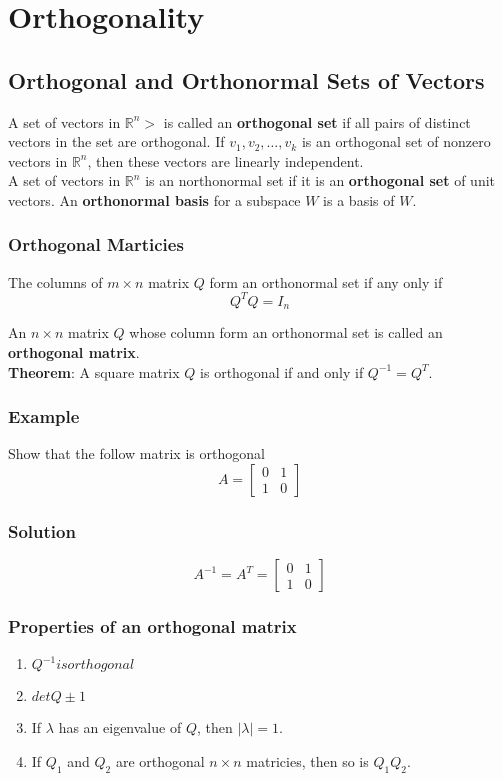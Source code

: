\setcounter{chapter}{4}
\chapter{Orthogonality}

\section{Orthogonal and Orthonormal Sets of Vectors}
A set of vectors in $\mathbb{R}^n>$ is called an \textbf{orthogonal set} if all pairs of distinct vectors in the set are orthogonal.
If ${v_1, v_2, \dots, v_k}$ is an orthogonal set of nonzero vectors in $\mathbb{R}^n$, then these vectors are linearly independent.\\

A  set of vectors in $\mathbb{R}^n$ is an northonormal set if it is an \textbf{orthogonal set} of unit vectors. An \textbf{orthonormal basis} for a subspace $W$ is a basis of $W$. 

\subsection*{Orthogonal Marticies}
The columns of $m\times n$ matrix $Q$ form an orthonormal set if any only if
$$Q^TQ = I_n$$

An $n\times n$ matrix $Q$ whose column form an orthonormal set is called an \textbf{orthogonal matrix}.\\
\textbf{Theorem}: A square matrix $Q$ is orthogonal if and only if $Q^{-1} = Q^T$.

\subsection*{Example}
Show that the follow matrix is orthogonal
$$A = \begin{bmatrix}
    0&1\\1&0
\end{bmatrix}$$
\subsection*{Solution}
$$A^{-1} = A^T = \begin{bmatrix}
    0&1\\1&0
\end{bmatrix}$$

\subsection*{Properties of an orthogonal matrix}
\begin{enumerate}
    \item $Q^{-1} is orthogonal$
    \item $det Q \pm 1$
    \item If $\lambda$ has an eigenvalue of $Q$, then $|\lambda| = 1$.
    \item If $Q_1$ and $Q_2$ are orthogonal $n\times n$ matricies, then so is $Q_1Q_2$.
\end{enumerate}

